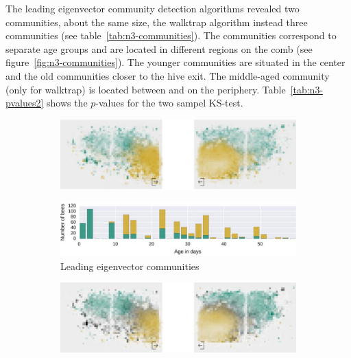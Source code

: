 The leading eigenvector community detection algorithms revealed two communities, about the same size, the walktrap algorithm instead three communities (see table~\ref{tab:n3-communities}).
The communities correspond to separate age groups and are located in different regions on the comb (see figure~\ref{fig:n3-communities}). The younger communities are situated in the center and the old communities closer to the hive exit. The middle-aged community (only for walktrap) is located between and on the periphery. Table~\ref{tab:n3-pvalues2} shows the $p$-values for the two sampel KS-test.




\begin{figure}[!htb]
	\centering
	\begin{subfigure}[b]{1.0\textwidth}
	\centering
	\includegraphics[width=1.0\textwidth]{Figures/le_network3}
	\end{subfigure} 
	\begin{subfigure}[b]{1.0\textwidth}
	\centering
	\includegraphics[width=1.0\textwidth]{Figures/n3-ageDistribution-LE}
	\caption[Leading eigenvector communities]{Leading eigenvector communities}
	\label{fig:n3ageLE}
	\end{subfigure}
	\begin{subfigure}[b]{1.0\textwidth}
	\vspace{5mm}
	\centering
	\includegraphics[width=1.0\textwidth]{Figures/wt_network3}

\end{subfigure}
\end{figure}
